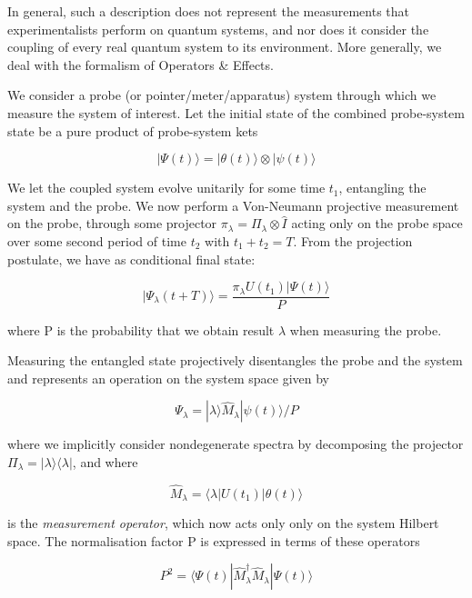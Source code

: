 In general, such a description does not represent the measurements that experimentalists perform on quantum systems, and nor does it consider the coupling of every real quantum system to its environment.
More generally, we deal with the formalism of Operators \& Effects.

We consider a probe (or pointer/meter/apparatus) system through which we measure the system of interest.
Let the initial state of the combined probe-system state be a pure product of probe-system kets

\begin{equation}
  | \Psi (t) \rangle = | \theta (t) \rangle \otimes | \psi (t) \rangle
\end{equation}

We let the coupled system evolve unitarily for some time $t_1$, entangling the system and the probe.
We now perform a Von-Neumann projective measurement on the probe, through some projector $\pi_\lambda = \Pi_\lambda \otimes \hat{I}$ acting only on the probe space over some second period of time $t_2$ with $t_1 + t_2 = T$.
From the projection postulate, we have as conditional final state:

\begin{equation}
    | \Psi_\lambda (t+T) \rangle = \frac{\pi_\lambda U(t_1) |\Psi(t)\rangle}{P}
\end{equation}

where P is the probability that we obtain result $\lambda$ when measuring the probe.

Measuring the entangled state projectively disentangles the probe and the system and represents an operation on the system space given by

\begin{equation}
\Psi_\lambda = | \lambda \rangle \hat{M}_\lambda | \psi(t) \rangle / P
\end{equation}

where we implicitly consider nondegenerate spectra by decomposing the projector $\Pi_\lambda = |\lambda \rangle \langle \lambda |$, and where

\begin{equation}
     \hat{M}_\lambda = \langle \lambda | U(t_1) | \theta(t) \rangle
\end{equation}

is the \emph{measurement operator}, which now acts only only on the system Hilbert space.
The normalisation factor P is expressed in terms of these operators

\begin{equation}
     P^2 = \langle \Psi (t) | \hat{M}_\lambda^\dagger \hat{M}_\lambda | \Psi (t) \rangle
\end{equation}

